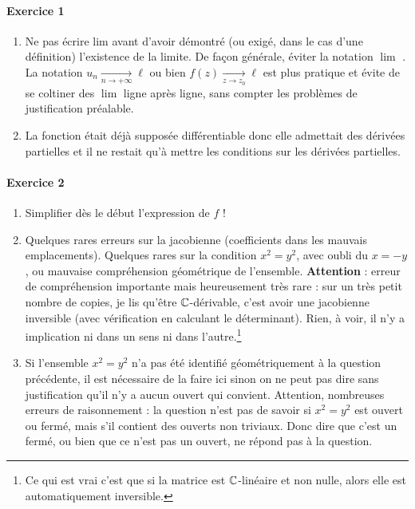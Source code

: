 \paragraph{Exercice 1}
\begin{enumerate}
\item Ne pas écrire \og lim\fg{} avant d'avoir démontré (ou exigé, dans le cas d'une définition) l'existence de la limite.  De façon générale, éviter la notation \og $\lim$ \fg. La notation $u_n\xrightarrow[n\to +\infty]{} \ell$ ou bien $f(z)\xrightarrow[z\to z_0]{} \ell$ est plus pratique et évite de se coltiner des \og $\lim$\fg{} ligne après ligne, sans compter les problèmes de justification préalable.
\item La fonction était déjà supposée différentiable donc elle admettait des dérivées partielles et  il ne restait qu'à mettre les conditions sur les dérivées partielles.
\end{enumerate}

\paragraph{Exercice 2}
\begin{enumerate}
\item Simplifier dès le début l'expression de $f$ !
\item Quelques rares erreurs sur la jacobienne (coefficients dans les mauvais emplacements). Quelques rares sur la condition $x^2=y^2$, avec oubli du $x=-y$, ou mauvaise compréhension géométrique de l'ensemble. \textbf{Attention} : erreur de compréhension importante mais heureusement très rare : sur un très petit nombre de copies, je lis qu'être $\mathbb{C}$-dérivable,  c'est avoir une jacobienne inversible (avec vérification en calculant le déterminant). Rien, à voir, il n'y a implication ni dans un sens ni dans l'autre.\footnote{Ce qui est vrai c'est que si la matrice est $\mathbb{C}$-linéaire et non nulle, alors elle est automatiquement inversible. }
\item Si l'ensemble $x^2=y^2$ n'a pas été identifié géométriquement à la question précédente, il est nécessaire de la faire ici sinon on ne peut pas  dire sans justification qu'il n'y a aucun ouvert qui convient.  Attention, nombreuses erreurs de raisonnement : la question n'est pas de savoir si $x^2=y^2$ est ouvert ou fermé, mais s'il contient des ouverts non triviaux. Donc dire que c'est un fermé, ou bien que ce n'est pas un ouvert, ne répond pas à la question. 
\end{enumerate}

